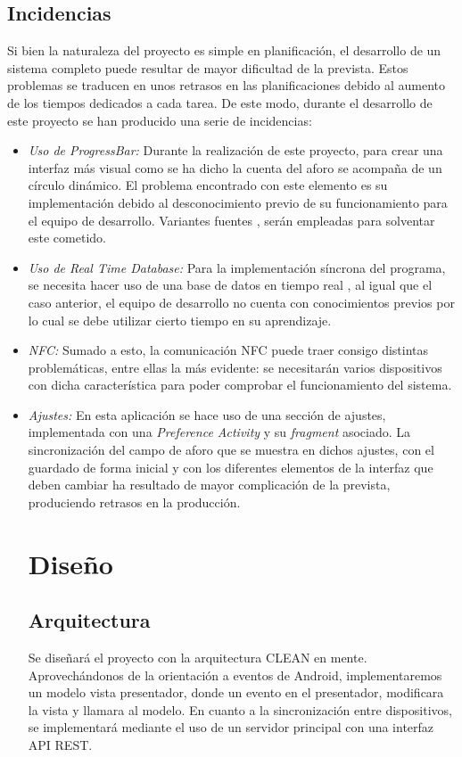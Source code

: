 \documentclass[a4paper,openright,12pt]{article}
\begin{document}
\subsection{Incidencias}
Si bien la naturaleza del proyecto es simple en planificación, el desarrollo de un sistema completo puede resultar de mayor dificultad de la prevista. Estos problemas se traducen en unos retrasos en las planificaciones debido al aumento de los tiempos dedicados a cada tarea. 
De este modo, durante el desarrollo de este proyecto se han producido una serie de incidencias:
\begin{itemize}
    \item \textit{Uso de ProgressBar:} Durante la realización de este proyecto, para crear una interfaz más visual como se ha dicho la cuenta del aforo se acompaña de un círculo dinámico. El problema encontrado con este elemento es su implementación debido al desconocimiento previo de su funcionamiento para el equipo de desarrollo. Variantes fuentes \cite{ProgressBar_developer}, \cite{ProgressBar_develou} serán empleadas para solventar este cometido.
 \item \textit{Uso de Real Time Database:} Para la implementación síncrona del programa, se necesita hacer uso de una base de datos en tiempo real \cite{Firebase_DOC}, al igual que el caso anterior, el equipo de desarrollo no cuenta con conocimientos previos por lo cual se debe utilizar cierto tiempo en su aprendizaje.
     \item \textit{NFC:} 
     Sumado a esto, la comunicación NFC puede traer consigo distintas problemáticas, entre ellas la más evidente: se necesitarán varios dispositivos con dicha característica para poder comprobar el funcionamiento del sistema.
      \item \textit{Ajustes:} En esta aplicación se hace uso de una sección de ajustes, implementada con una \textit{Preference Activity} y su \textit{fragment} asociado. La sincronización del campo de aforo que se muestra en dichos ajustes, con el guardado de forma inicial y con los diferentes elementos de la interfaz que deben cambiar ha resultado de mayor complicación de la prevista, produciendo retrasos en la producción.
 




\section{Diseño}
\subsection{Arquitectura}
Se diseñará el proyecto con la arquitectura CLEAN en mente.
Aprovechándonos de la orientación a eventos de Android, implementaremos un modelo vista presentador, donde un evento en el presentador, modificara la vista y llamara al modelo.
En cuanto a la sincronización entre dispositivos, se implementará mediante el uso de un servidor principal con una interfaz API REST.

\end{itemize}
\end{document}
